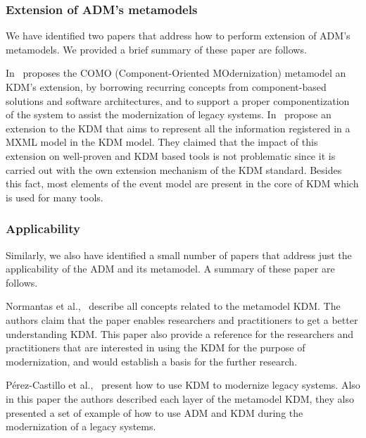 \subsubsection{Extension of ADM's metamodels} %
\label{ssub:extension_of_adm_s_metamodels}

We have identified two papers that address how to perform extension of ADM's metamodels. We provided a brief summary of these paper are follows. 

In~\cite{5773392} proposes the COMO (Component-Oriented MOdernization) metamodel an KDM's extension, by borrowing recurring concepts from component-based solutions and software architectures, and to support a proper componentization of the system to assist the modernization of legacy systems. In~\cite{Perez-Castillo:2012:IEL:2231936.2231949} propose an extension to the KDM that aims to represent all the information registered in a MXML model in the KDM model. They claimed that the impact of this extension on well-proven and KDM based tools is not problematic since it is carried out with the own extension mechanism of the KDM standard. Besides this fact, most elements of the event model are present in the core of KDM which is used for many tools.


\subsubsection{Applicability} %
\label{ssub:applicability}

Similarly, we also have identified a small number of papers that address just the applicability of the ADM and its metamodel. A summary of these paper are follows.

Normantas et al.,~\cite{Normantas:2012:OKD:2383276.2383286} describe all concepts related to the metamodel KDM. The authors claim that the paper enables researchers and practitioners to get a better understanding KDM. This paper also provide a reference for the researchers and practitioners that are interested in using the KDM for the purpose of modernization, and would establish a basis for the further research. 

P\'{e}rez-Castillo et al.,~\cite{PrezCastillo2011519} present how to use KDM to modernize legacy systems. Also in this paper the authors described each layer of the metamodel KDM, they also presented a set of example of how to use ADM and KDM during the modernization of a legacy systems.









